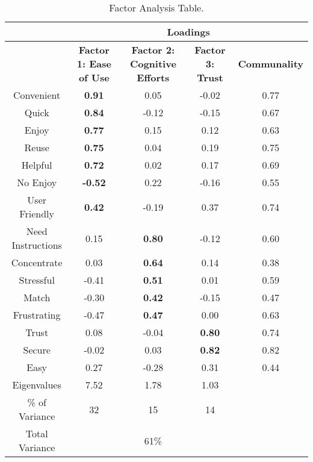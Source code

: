 \documentclass[conference]{IEEEtran}
\begin{document}
\begin{table*}[ttt]
\begin{center}
\small
\begin{tabular}{| c | | c | c | c | c |}
  \hline                    
   &    \multicolumn{4}{c}{\textbf{Loadings}} \\
  \hline                        
   & \textbf{Factor 1: Ease of Use} & \textbf{Factor 2: Cognitive Efforts} & \textbf{Factor 3: Trust} & \textbf{Communality} \\
  \hline      \hline    
  \textsf{\small Convenient} & \textbf{0.91} & 0.05 & -0.02 & 0.77 \\ \hline  
  \textsf{\small Quick} & \textbf{0.84} & -0.12 & -0.15 & 0.67 \\ \hline  
  \textsf{\small Enjoy} & \textbf{0.77} & 0.15 & 0.12 & 0.63 \\ \hline  
  \textsf{\small Reuse} & \textbf{0.75} & 0.04 & 0.19 & 0.75 \\ \hline  
  \textsf{\small Helpful} & \textbf{0.72} & 0.02 & 0.17 & 0.69\\ \hline  
  \textsf{\small No Enjoy} & \textbf{-0.52} & 0.22 & -0.16 & 0.55 \\ \hline  
  \textsf{\small User Friendly} & \textbf{0.42} & -0.19 & 0.37 & 0.74 \\ \hline  
  \textsf{\small Need Instructions} & 0.15 & \textbf{0.80} & -0.12 & 0.60\\ \hline  
  \textsf{\small Concentrate} & 0.03 & \textbf{0.64} & 0.14 & 0.38 \\ \hline  
  \textsf{\small Stressful} & -0.41 & \textbf{0.51} & 0.01 & 0.59 \\ \hline  
  \textsf{\small Match} & -0.30 & \textbf{0.42} & -0.15 & 0.47 \\ \hline  
  \textsf{\small Frustrating} & -0.47 & \textbf{0.47} & 0.00 & 0.63 \\ \hline  
  \textsf{\small Trust} & 0.08  & -0.04  & \textbf{0.80} & 0.74\\ \hline      
  \textsf{\small Secure} & -0.02 & 0.03 & \textbf{0.82} & 0.82\\ \hline      
  \textsf{\small Easy} & 0.27 & -0.28 & 0.31 & 0.44 \\ \hline \hline        
  Eigenvalues & 7.52 & 1.78 & 1.03 & \\ \hline 
  \% of Variance & 32 & 15 & 14 &  \\ \hline 
  Total Variance & & 61\% & &\\ \hline 
\end{tabular}
\end{center}
\vspace{0.2cm}
\caption{Factor Analysis Table.}\label{tab:factor}
 \end{table*}
\end{document}
